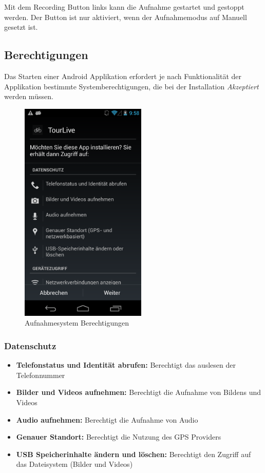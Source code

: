 Mit dem Recording Button links kann die Aufnahme gestartet und gestoppt werden. Der Button ist nur aktiviert, wenn der Aufnahmemodus auf Manuell gesetzt ist.

\pagebreak
\subsection{Berechtigungen}
Das Starten einer Android Applikation erfordert je nach Funktionalität der Applikation bestimmte Systemberechtigungen, die bei der Installation \textit{Akzeptiert} werden müssen.
\begin{figure}[H]
	\centering
	\includegraphics[width=60mm]{images/android/berechtigungen.png}
	\caption{Aufnahmesystem Berechtigungen}
\end{figure}
\subsubsection{Datenschutz}

\begin{itemize} [noitemsep,topsep=0pt]
	\item \textbf{Telefonstatus und Identität abrufen:} Berechtigt das auslesen der Telefonnummer
	\item \textbf{Bilder und Videos aufnehmen:} Berechtigt die Aufnahme von Bildens und Videos
	\item \textbf{Audio aufnehmen:} Berechtigt die Aufnahme von Audio
	\item \textbf{Genauer Standort:} Berechtigt die Nutzung des GPS Providers
	\item \textbf{USB Speicherinhalte ändern und löschen:} Berechtigt den Zugriff auf das Dateisystem (Bilder und Videos)
\end{itemize}

